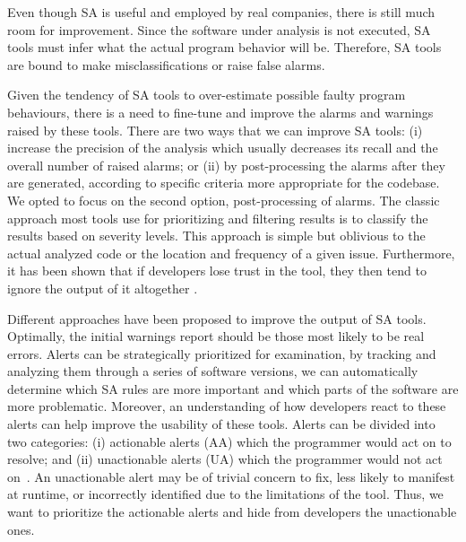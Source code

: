 

Even though SA is useful and employed by real companies, there is still much room for improvement. Since the software under analysis is not executed, SA tools must infer what the actual program behavior will be. Therefore, SA tools are bound to make misclassifications or raise false alarms.

Given the tendency of SA tools to over-estimate possible faulty program behaviours, there is a need to fine-tune and improve the alarms and warnings raised by these tools. There are two ways that we can improve SA tools: (i) increase the precision of the analysis which usually decreases its recall and the overall number of raised alarms; or (ii) by post-processing the alarms after they are generated, according to specific criteria more appropriate for the codebase. We opted to focus on the second option, post-processing of alarms. 
The classic approach most tools use for prioritizing and filtering results is to classify the results based on severity levels. This approach is simple but oblivious to the actual analyzed code or the location and frequency of a given issue. Furthermore, it has been shown that if developers lose trust in the tool, they then tend to ignore the output of it altogether \cite{sa_google}.

Different approaches have been proposed to improve the output of SA tools. Optimally, the initial warnings report should be those most likely to be real errors. Alerts can be strategically prioritized for examination, by tracking and analyzing them through a series of software versions, we can automatically determine which SA rules are more important and which parts of the software are more problematic. 
Moreover, an understanding of how developers react to these alerts can help improve the usability of these tools. Alerts can be divided into two categories: (i) actionable alerts (AA) which the programmer would act on to resolve; and (ii) unactionable alerts (UA) which the programmer would not act on~\cite{comparative_heckman, actionable_sa}. An unactionable alert may be of trivial concern to fix, less likely to manifest at runtime, or incorrectly identified due to the limitations of the tool. Thus, we want to prioritize the actionable alerts and hide from developers the unactionable ones.

